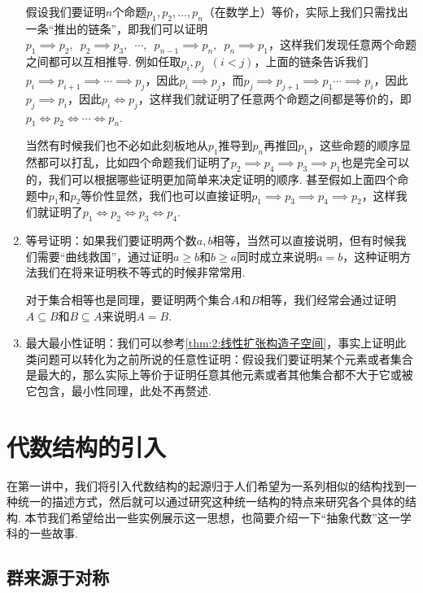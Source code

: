 \begin{enumerate}
          假设我们要证明$n$个命题$p_1,p_2,\ldots,p_n$（在数学上）等价，实际上我们只需找出一条``推出的链条''，即我们可以证明$p_1\implies p_2,\enspace p_2\implies p_3,\enspace \cdots,\enspace p_{n-1}\implies p_n,\enspace p_n\implies p_1$，这样我们发现任意两个命题之间都可以互相推导. 例如任取$p_i, p_j\enspace (i<j)$，上面的链条告诉我们$p_i\implies p_{i+1}\implies\cdots\implies p_j$，因此$p_i\implies p_j$，而$p_j\implies p_{j+1}\implies p_1\cdots\implies p_i$，因此$p_j\implies p_i$，因此$p_i\iff p_j$，这样我们就证明了任意两个命题之间都是等价的，即$p_1\iff p_2\iff\cdots\iff p_n$.

          当然有时候我们也不必如此刻板地从$p_1$推导到$p_n$再推回$p_1$，这些命题的顺序显然都可以打乱，比如四个命题我们证明了$p_2\implies p_4\implies p_3\implies p_1$也是完全可以的，我们可以根据哪些证明更加简单来决定证明的顺序. 甚至假如上面四个命题中$p_1$和$p_2$等价性显然，我们也可以直接证明$p_1\implies p_3\implies p_4\implies p_2$，这样我们就证明了$p_1\iff p_2\iff p_3\iff p_4$.

    \item 等号证明：如果我们要证明两个数$a,b$相等，当然可以直接说明，但有时候我们需要``曲线救国''，通过证明$a\geqslant b$和$b\geqslant a$同时成立来说明$a=b$，这种证明方法我们在将来证明秩不等式的时候非常常用.

          对于集合相等也是同理，要证明两个集合$A$和$B$相等，我们经常会通过证明$A\subseteq B$和$B\subseteq A$来说明$A=B$.

    \item 最大最小性证明：我们可以参考\autoref{thm:2:线性扩张构造子空间}，事实上证明此类问题可以转化为之前所说的任意性证明：假设我们要证明某个元素或者集合是最大的，那么实际上等价于证明任意其他元素或者其他集合都不大于它或被它包含，最小性同理，此处不再赘述.
\end{enumerate}

\section{代数结构的引入}

在第一讲中，我们将引入代数结构的起源归于人们希望为一系列相似的结构找到一种统一的描述方式，然后就可以通过研究这种统一结构的特点来研究各个具体的结构. 本节我们希望给出一些实例展示这一思想，也简要介绍一下``抽象代数''这一学科的一些故事.

\subsection{群来源于对称}

